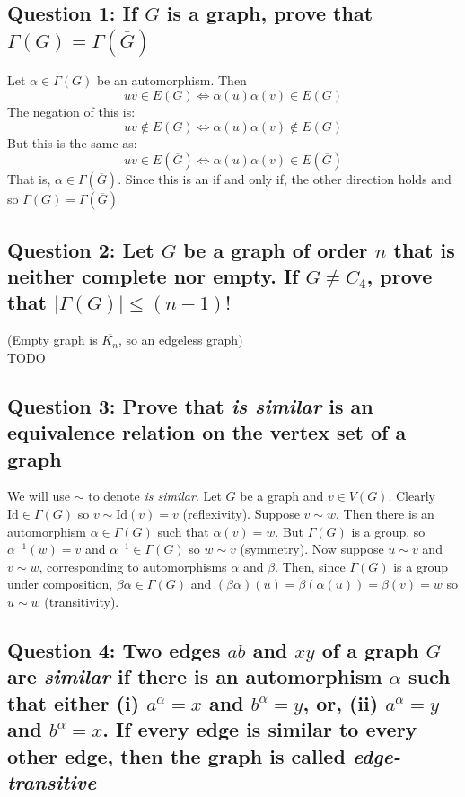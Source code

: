 \documentclass[letterpaper, 11pt]{article}
\newcommand{\1}{\mathds{1}}	%
\theoremstyle{definition}
\begin{document}
\subsection*{Question 1: If $G$ is a graph, prove that $\Gamma (G) = \Gamma ( \overline{G})$}
Let $\alpha \in \Gamma (G)$ be an automorphism. Then \[
uv \in E(G) \iff \alpha (u) \alpha (v) \in E(G) 
\]
The negation of this is:
\[
uv \notin E(G) \iff \alpha (u) \alpha (v) \notin E(G)
\]
But this is the same as:
\[
uv \in E(\overline{G}) \iff \alpha (u) \alpha (v) \in E(\overline{G})
\]
That is, $\alpha \in \Gamma (\overline{G})$. Since this is an if and only if, the other direction holds and so $\Gamma(G) = \Gamma (\overline{G})$

\subsection*{Question 2: Let $G$ be a graph of order $n$ that is neither complete nor empty. If $G \ne C_4$, prove that $|\Gamma(G)| \le (n-1)!$}
(Empty graph is $\overline{K_n}$, so an edgeless graph) ~\\ TODO

\subsection*{Question 3: Prove that \textit{is similar} is an equivalence relation on the vertex set of a graph}
We will use $\sim$ to denote \textit{is similar}. Let $G$ be a graph and $v \in V(G)$. Clearly $\text{Id} \in \Gamma(G)$ so $v \sim \text{Id}(v) = v$ (reflexivity). Suppose $v \sim w$. Then there is an automorphism $\alpha \in \Gamma(G)$ such that $\alpha (v) = w$. But $\Gamma(G)$ is a group, so $\alpha^{-1}(w) = v$ and $\alpha^{-1} \in \Gamma(G)$ so $w \sim v$ (symmetry). Now suppose $u \sim v$ and $v \sim w$, corresponding to automorphisms $\alpha$ and $\beta$. Then, since $\Gamma(G)$ is a group under composition, $\beta \alpha \in \Gamma(G)$ and $(\beta \alpha )(u) = \beta (\alpha (u)) = \beta (v) = w$ so $u \sim w$ (transitivity).

\subsection*{Question 4: Two edges $ab$ and $xy$ of a graph $G$ are \textit{similar} if there is an automorphism $\alpha$ such that either (i) $a^\alpha = x$ and $b^\alpha = y$, or, (ii) $a^\alpha = y$ and $b^\alpha = x$. If every edge is similar to every other edge, then the graph is called \textit{edge-transitive}}
\end{document}
